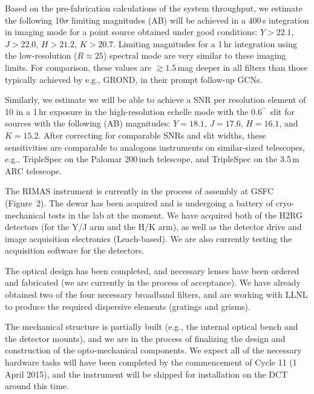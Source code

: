 \documentclass[letterpaper,11pt]{article}
\newcommand{\arcsec}{\mbox{$^{\prime\prime}$}}%
\begin{document}
\smallskip

Based on the pre-fabrication calculations of the system throughput, we estimate 
the following 10$\sigma$ limiting magnitudes (AB) will be achieved in a 400\,s
integration in imaging mode for a point source obtained under good 
conditions: $Y > 22.1$, $J > 22.0$, $H > 21.2$, $K > 20.7$.  Limiting
magnitudes for a 1\,hr integration using the low-resolution ($R \approx 25$)
spectral mode are very similar to these imaging limits.  For comparison, 
these values are $\gtrsim 1.5$\,mag deeper in all filters than those typically 
achieved by e.g., GROND, in their prompt follow-up GCNs.

Similarly, we estimate we will be able to achieve a SNR per resolution element of 
10 in a 1\,hr exposure in the high-resolution echelle mode with the 0.6\arcsec\ 
slit for sources with the following (AB) magnitudes: $Y = 18.1$, $J = 17.6$, 
$H = 16.1$, and $K = 15.2$.  After correcting for comparable SNRs and slit
widths, these sensitivities are comparable to analogous instruments on 
similar-sized telescopes, e.g., TripleSpec on the Palomar 200\,inch telescope, and
TripleSpec on the 3.5\,m ARC telescope.

\smallskip

The RIMAS instrument is currently in the process of assembly at GSFC (Figure~2).
The dewar has been acquired and is undergoing a battery of cryo-mechanical tests in
the lab at the moment.  We have acquired both of the H2RG detectors (for the Y/J 
arm and the H/K arm), as well as the detector drive and image acquisition electronics
(Leach-based).  We are also currently testing the acquisition software for the 
detectors.

The optical design has been completed, and necessary lenses have been ordered and
fabricated (we are currently in the process of acceptance).  We have already obtained
two of the four necessary broadband filters, and are working with LLNL to produce
the required dispersive elements (gratings and grisms).  

The mechanical structure is partially built (e.g., the internal optical bench and 
the detector mounts), and we are in the process of finalizing the design and
construction of the opto-mechanical components.  We expect all of the necessary 
hardware tasks will have been completed by the commencement of Cycle 11 (1 April 2015), 
and the instrument will be shipped for installation on the DCT around this time.
\end{document}
